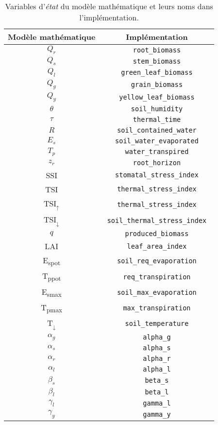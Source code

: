 
\begin{table}[H]
  \centering
  \begin{tabular}{|c|c|}
    \hline
    \textbf{Modèle mathématique} & \textbf{Implémentation} \\
    \hline
    $Q_r$ & \lstinline| root_biomass | \\
    $Q_s$ & \lstinline| stem_biomass | \\
    $Q_l$ & \lstinline| green_leaf_biomass | \\
    $Q_g$ & \lstinline| grain_biomass | \\
    $Q_y$ & \lstinline| yellow_leaf_biomass | \\
    $\theta$ & \lstinline| soil_humidity | \\
    $\tau$ & \lstinline| thermal_time | \\
    $R$ & \lstinline| soil_contained_water | \\
    $E_s$ & \lstinline| soil_water_evaporated | \\
    $T_p$ & \lstinline| water_transpired | \\
    $z_r$ & \lstinline| root_horizon | \\
    SSI & \lstinline| stomatal_stress_index | \\
    TSI & \lstinline| thermal_stress_index | \\
    TSI$_{\uparrow}$ & \lstinline| thermal_stress_index | \\
    TSI$_{\downarrow}$ & \lstinline| soil_thermal_stress_index | \\
    $q$ & \lstinline| produced_biomass | \\
    LAI & \lstinline| leaf_area_index | \\
    E\textsubscript{spot} & \lstinline| soil_req_evaporation | \\
    T\textsubscript{ppot} & \lstinline| req_transpiration | \\
    E\textsubscript{smax} & \lstinline| soil_max_evaporation | \\
    T\textsubscript{pmax} & \lstinline| max_transpiration | \\
    T$_{\downarrow}$ & \lstinline| soil_temperature | \\
    $\alpha_g$ & \lstinline| alpha_g | \\
    $\alpha_s$ & \lstinline| alpha_s | \\
    $\alpha_r$ & \lstinline| alpha_r | \\
    $\alpha_l$ & \lstinline| alpha_l | \\
    $\beta_s$ & \lstinline| beta_s | \\
    $\beta_l$ & \lstinline| beta_l | \\
    $\gamma_l$ & \lstinline| gamma_l | \\
    $\gamma_y$ & \lstinline| gamma_y | \\
    \hline
    \end{tabular}
  \caption{Variables d'\emph{état} du modèle mathématique et leurs noms
  dans l'implémentation.}
  \label{table:state_var}
\end{table}

